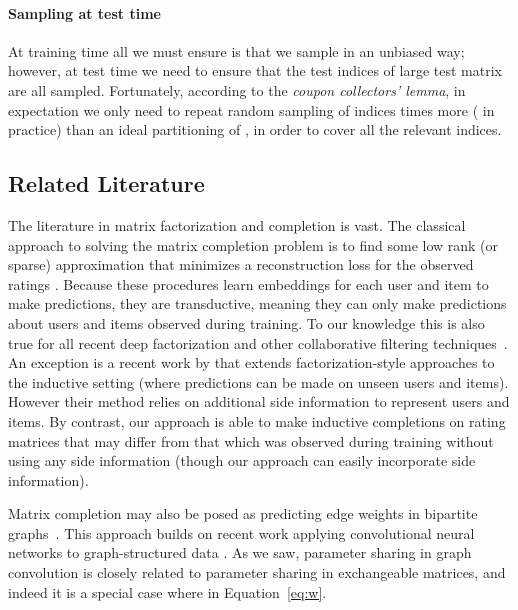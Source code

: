 \documentclass{article}
\newcommand{\eg}[0]{\emph{e.g.},~}
\theoremstyle{definition}
\begin{document}
\paragraph{Sampling at test time} At training time all we must ensure is that we sample in an unbiased way; however, at test time we need to ensure that the test indices  of large test matrix  are all sampled.
Fortunately, according to the \textit{coupon collectors' lemma}, in expectation we only need to repeat
random sampling of indices 
 times more ( in practice) than an ideal partitioning of , in order to cover all the relevant indices. 









\subsection{Related Literature}\label{sec:related}
The literature in matrix factorization and completion is vast. 
The classical approach to solving the matrix completion problem is to find some low rank (or sparse) approximation that minimizes a reconstruction loss for the observed ratings \citep[see e.g.,][]{candes2009exact, koren2009matrix, mnih2008probabilistic}. 
Because these procedures learn embeddings for each user and item to make predictions, they are {transductive}, meaning they can only make predictions about users and items observed during training. To our knowledge this is also true for all recent   
deep factorization and other collaborative filtering techniques~\citep[\eg][]{salakhutdinov2007restricted,deng2017factorized,sedhain2015autorec,wang2015collaborative,li2015deep,zheng2016neural,dziugaite2015neural}.
An exception is a recent work by \citet{yang2016revisiting} that extends factorization-style approaches to the {inductive} setting (where predictions can be made on unseen users and items). However their method relies on additional side information to represent users and items. By contrast, our approach is able to make inductive completions on rating matrices that may differ from that which was observed during training without using any side information (though our approach can easily incorporate side information).

Matrix completion may also be posed as predicting edge weights in bipartite graphs~\citep{berg2017graph,monti_geomatrix}.
This approach builds on recent work applying convolutional neural networks to graph-structured data \citep{scarselli2009graph,bruna2013spectral,duvenaud2015convolutional, defferrard2016convolutional, kipf2016semi,hamilton2017inductive}. As we saw, parameter sharing in graph convolution is closely related to parameter sharing in exchangeable matrices, and indeed it is a special case where  in Equation~\cref{eq:w}.
\end{document}
